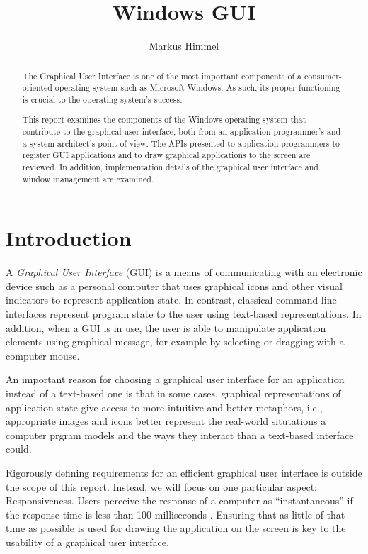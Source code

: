 \documentclass[10pt,twocolumn,a4paper]{article}
\author{Markus Himmel}
\title{Windows GUI}
\begin{document}
	\maketitle

	\begin{abstract}
		The Graphical User Interface is one of the most important components
		of a consumer-oriented operating system such as Microsoft Windows. As
		such, its proper functioning is crucial to the operating system's success.

		This report examines the components of the Windows operating system
		that contribute to the graphical user interface, both from an
		application programmer's and a system architect's point of view. The
		APIs presented to application programmers to register GUI applications
		and to draw graphical applications to the screen are reviewed. In addition,
		implementation details of the graphical user interface and window management
		are examined.
	\end{abstract}

	\section{Introduction}
		A \textit{Graphical User Interface} (GUI) is a means of communicating
		with an electronic device such as a personal computer that uses graphical
		icons and other visual indicators to represent application state. In
		contrast, classical command-line interfaces represent program state to
		the user using text-based representations. In addition, when a GUI is
		in use, the user is able to manipulate application elements using graphical
		message, for example by selecting or dragging with a computer mouse.

		An important reason for choosing a graphical user interface for an
		application instead of a text-based one is that in some cases, graphical
		representations of application state give access to more intuitive and
		better metaphors, i.e., appropriate images and icons better represent
		the real-world situtations a computer prgram models and the ways they
		interact than a text-based interface could.

		Rigorously defining requirements for an efficient graphical user
		interface is outside the scope of this report. Instead, we will focus
		on one particular aspect: Responsiveness. Users perceive the response
		of a computer as \enquote{instantaneous} if the response time is less
		than 100 milliseconds \cite{miller1968response}. Ensuring that as
		little of that time as possible is used for drawing the application on
		the screen is key to the usability of a graphical user interface.
\end{document}
